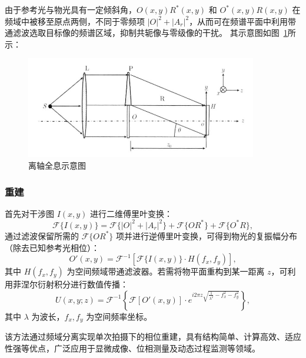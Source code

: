 \documentclass[a4paper]{report} %
\begin{document}
由于参考光与物光具有一定倾斜角，$O(x,y) R^*(x,y)$ 和 $O^*(x,y) R(x,y)$ 在频域中被移至原点两侧，不同于零频项 $|O|^2 + |A_r|^2$，从而可在频谱平面中利用带通滤波选取目标像的频谱区域，抑制共轭像与零级像的干扰。
其示意图如图~\ref{fig:lizhoushiyi}所示：
\begin{figure}[H]
    \centering
    \includegraphics[width=0.9\textwidth]{离轴示意图.jpg}
    \caption{离轴全息示意图}
    \label{fig:lizhoushiyi}
\end{figure}
\subsubsection{重建}
首先对干涉图 $I(x,y)$ 进行二维傅里叶变换：
\begin{equation}
\mathcal{F}\{I(x,y)\} = \mathcal{F}\{|O|^2 + |A_r|^2\} + \mathcal{F}\{O R^*\} + \mathcal{F}\{O^* R\},
\end{equation}
通过滤波保留所需的 $\mathcal{F}\{O R^*\}$ 项并进行逆傅里叶变换，可得到物光的复振幅分布（除去已知参考光相位）：
\begin{equation}
O'(x,y) = \mathcal{F}^{-1} \left[ \mathcal{F}\{I(x,y)\} \cdot H(f_x,f_y) \right],
\end{equation}
其中 $H(f_x,f_y)$ 为空间频域带通滤波器。若需将物平面重构到某一距离 $z$，可利用菲涅尔衍射积分进行数值传播：
\begin{equation}
U(x,y;z) = \mathcal{F}^{-1} \left\{ \mathcal{F}[O'(x,y)] \cdot e^{i 2\pi z \sqrt{\frac{1}{\lambda^2} - f_x^2 - f_y^2}} \right\},
\end{equation}
其中 $\lambda$ 为波长，$f_x,f_y$ 为空间频率坐标。

该方法通过频域分离实现单次拍摄下的相位重建，具有结构简单、计算高效、适应性强等优点，广泛应用于显微成像、位相测量及动态过程监测等领域。
\end{document}

